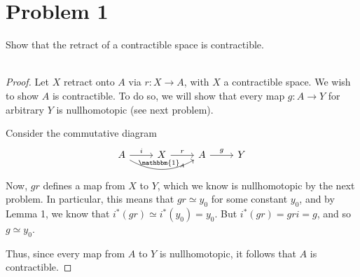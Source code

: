 \documentclass[fontsize=11pt]{scrartcl} %
\numberwithin{equation}{section} %
\numberwithin{figure}{section} %
\numberwithin{table}{section} %
\begin{document}
\newpage

\section*{Problem 1} %
Show that the retract of a contractible space is contractible.
\\
\\
\begin{proof}
    Let $X$ retract onto $A$ via $r:X\to A$, with $X$ a contractible space.
    We wish to show $A$ is contractible. To do so, we will show that every
    map $g:A\to Y$ for arbitrary $Y$ is nullhomotopic (see next problem).

    Consider the commutative diagram
    \[
        \begin{tikzcd}
        A\arrow{r}{i}\arrow[bend right]{rr}{\mathbbm{1}_A} &X\arrow{r}{r}
            &A\arrow{r}{g} &Y
        \end{tikzcd}
    \]
    Now, $gr$ defines a map from $X$ to $Y$, which we know is nullhomotopic by
    the next problem. In particular, this means that $gr\simeq y_0$ for some
    constant $y_0$, and by Lemma 1, we know that $i^*(gr)\simeq i^*(y_0)=y_0$.
    But $i^*(gr)=gri=g$, and so $g\simeq y_0$.

    Thus, since every map from $A$ to $Y$ is nullhomotopic, it follows that $A$
    is contractible.

\end{proof}

\newpage
\end{document}
